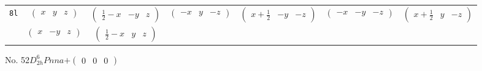 \documentclass[fleqn,9pt,landscape]{jsarticle}
\begin{document}
\begin{center}
\begin{longtable}{ccccccc}
{\tt 8l} & $ \begin{pmatrix} x & y & z \end{pmatrix} $ & $ \begin{pmatrix} \frac{1}{2} - x & - y & z \end{pmatrix} $ & $ \begin{pmatrix} - x & y & - z \end{pmatrix} $ & $ \begin{pmatrix} x + \frac{1}{2} & - y & - z \end{pmatrix} $ & $ \begin{pmatrix} - x & - y & - z \end{pmatrix} $ & $ \begin{pmatrix} x + \frac{1}{2} & y & - z \end{pmatrix} $ \\
& $ \begin{pmatrix} x & - y & z \end{pmatrix} $ & $ \begin{pmatrix} \frac{1}{2} - x & y & z \end{pmatrix} $ & $  $ & $  $ & $  $ & $  $ \\
\end{longtable}
\end{center}
\newpage
No. 52\quad$D_{2h}^{6}$\quad$Pnna$\quad[ orthorhombic ]\quad$+\begin{pmatrix} 0 & 0 & 0 \end{pmatrix}$
\end{document}
